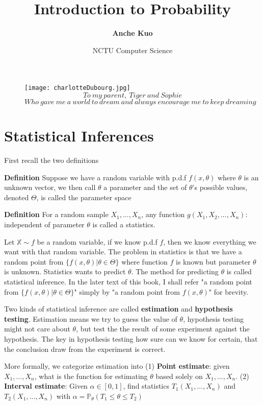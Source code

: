 \documentclass[a4paper,12pt]{article}
\title{\textbf{Introduction to Probability}}
\author{\textbf{Anche Kuo}}
\date{NCTU Computer Science}
\begin{document}
\maketitle

\begin{figure}[ht!]
\centering
\texttt{[image: charlotteDubourg.jpg]}
 
$$To\ my\ parent,\ Tiger\ and\ Sophie$$
$$Who\ gave\ me\ a\ world\ to\ dream\ and\ always\ encourage\ me\ to\ keep\ dreaming$$
\label{overflow}
\end{figure}

\newpage
\tableofcontents

\section{Statistical Inferences}

First recall the two definitions 

\textbf{Definition}
Suppose we have a random variable with p.d.f $f(x, \theta)$ where $\theta$ is an unknown vector, we then call $\theta$ a parameter and the set of $\theta$'s possible values, denoted $\Theta$, is called the parameter space 

\textbf{Definition}
For a random sample $X_1, ..., X_n$, any function $g(X_1, X_2, ..., X_n): $ independent of parameter $\theta$ is called a statistics. 

Let $\mathbb{X} \sim f$ be a random variable, if we know p.d.f $f$, then we know everything we want with that random variable. The problem in statistics is that we have a random point from $\{ f(x, \theta) | \theta\in\Theta \}$ where function $f$ is known but parameter $\theta$ is unknown. Statistics wants to predict $\theta$. The method for predicting $\theta$ is called statistical inference. In the later text of this book, I shall refer "a random point from $\{ f(x, \theta) | \theta\in\Theta \}$" simply by "a random point from $f(x, \theta)$" for brevity. 

Two kinds of statistical inference are called \textbf{estimation} and \textbf{hypothesis testing}. Estimation means we try to guess the value of $\theta$, hypothesis testing might not care about $\theta$, but test the the result of some experiment against the hypothesis. The key in hypothesis testing how sure can we know for certain, that the conclusion draw from the experiment is correct. 

More formally, we categorize estimation into 
(1) \textbf{Point estimate}: given $X_1, ..., X_n$, what is the function for estimating $\theta$ based solely on $X_1, ..., X_n$. 
(2) \textbf{Interval estimate}: Given $\alpha\in[0, 1]$, find statistics $T_1(X_1, ..., X_n)$ and $T_2(X_1, ..., X_n)$ with $\alpha = \mathbb{P}_{\theta}( T_1 \leq \theta \leq T_2 )$ 
\end{document}
